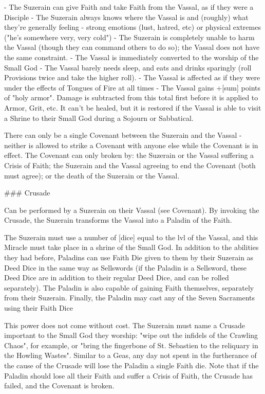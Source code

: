 - The Suzerain can give Faith and take Faith from the Vassal, as if they were a Disciple
- The Suzerain always knows where the Vassal is and (roughly) what they're generally feeling - strong emotions (lust, hatred, etc) or  physical extremes ("he's somewhere very, very cold")
- The Suzerain is completely unable to harm the Vassal (though they can command others to do so); the Vassal does not have the same constraint.
- The Vassal is immediately converted to the worship of the Small God
- The Vassal barely needs sleep, and eats and drinks sparingly (roll Provisions \UD twice and take the higher roll).
- The Vassal is affected as if they were under the effects of Tongues of Fire at all times
- The Vassal gains +[sum] points of "holy armor".  Damage is subtracted from this total first before it is applied to Armor, Grit, etc.  It can't be healed, but it is restored if the Vassal is able to visit a Shrine to their Small God during a Sojourn or Sabbatical.  

There can only be a single Covenant between the Suzerain and the Vassal - neither is allowed to strike a Covenant with anyone else while the Covenant is in effect.  The Covenant can only broken by: the Suzerain or the Vassal suffering a Crisis of Faith; the Suzerain and the Vassal agreeing to end the Covenant (both must agree); or the death of the Suzerain or the Vassal.



### Crusade

Can be performed by a Suzerain on their Vassal (see Covenant).  By invoking the Crusade, the Suzerain transforms the Vassal into a Paladin of the Faith.  

The Suzerain must use a number of [dice] equal to the {lvl} of the Vassal, and this Miracle must take place in a shrine of the Small God.  In addition to the abilities they had before, Paladins can use Faith Die given to them by their Suzerain as Deed Dice in the same way as Sellswords (if the Paladin is a Sellsword, these Deed Dice are in addition to their regular Deed Dice, and can be rolled separately).  The Paladin is also capable of gaining Faith themselves, separately from their Suzerain.  Finally, the Paladin may cast any of the Seven Sacraments using their Faith Dice

This power does not come without cost.  The Suzerain must name a Crusade important to the Small God they worship: "wipe out the infidels of the Crawling Chaos", for example, or "bring the fingerbone of St. Sebastien to the reliquary in the Howling Wastes".  Similar to a Geas, any day not spent in the furtherance of the cause of the Crusade will lose the Paladin a single Faith die.  Note that if the Paladin should lose all their Faith and suffer a Crisis of Faith, the Crusade has failed, and the Covenant is broken.

